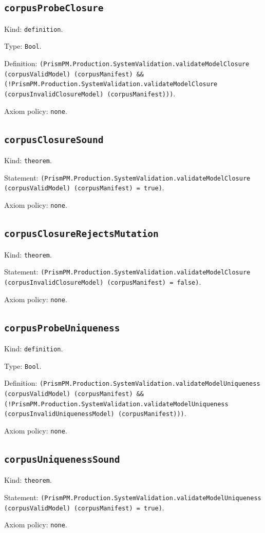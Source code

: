 \documentclass[11pt]{article}
\begin{document}
\subsection*{\texttt{corpusProbeClosure}}
\noindent Kind: \texttt{definition}.\par
\noindent Type: \texttt{Bool}.\par
\noindent Definition: \texttt{(PrismPM.Production.SystemValidation.validateModelClosure (corpusValidModel) (corpusManifest) \&\& (!PrismPM.Production.SystemValidation.validateModelClosure (corpusInvalidClosureModel) (corpusManifest)))}.\par
\noindent Axiom policy: \texttt{none}.\par
\subsection*{\texttt{corpusClosureSound}}
\noindent Kind: \texttt{theorem}.\par
\noindent Statement: \texttt{(PrismPM.Production.SystemValidation.validateModelClosure (corpusValidModel) (corpusManifest) = true)}.\par
\noindent Axiom policy: \texttt{none}.\par
\subsection*{\texttt{corpusClosureRejectsMutation}}
\noindent Kind: \texttt{theorem}.\par
\noindent Statement: \texttt{(PrismPM.Production.SystemValidation.validateModelClosure (corpusInvalidClosureModel) (corpusManifest) = false)}.\par
\noindent Axiom policy: \texttt{none}.\par
\subsection*{\texttt{corpusProbeUniqueness}}
\noindent Kind: \texttt{definition}.\par
\noindent Type: \texttt{Bool}.\par
\noindent Definition: \texttt{(PrismPM.Production.SystemValidation.validateModelUniqueness (corpusValidModel) (corpusManifest) \&\& (!PrismPM.Production.SystemValidation.validateModelUniqueness (corpusInvalidUniquenessModel) (corpusManifest)))}.\par
\noindent Axiom policy: \texttt{none}.\par
\subsection*{\texttt{corpusUniquenessSound}}
\noindent Kind: \texttt{theorem}.\par
\noindent Statement: \texttt{(PrismPM.Production.SystemValidation.validateModelUniqueness (corpusValidModel) (corpusManifest) = true)}.\par
\noindent Axiom policy: \texttt{none}.\par
\end{document}
